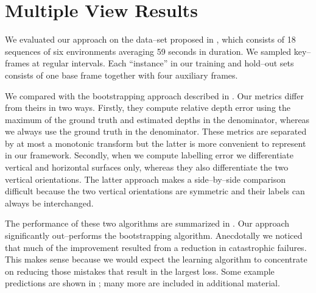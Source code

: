 \section{Multiple View Results}
\label{sec:mv-results}

We evaluated our approach on the data--set proposed in \cite{Flint11},
which consists of 18 sequences of six environments averaging 59
seconds in duration. We sampled key--frames at regular intervals. Each
``instance'' in our training and hold--out sets consists of one base
frame together with four auxiliary frames.

We compared with the bootstrapping approach described in
\cite{Flint11}. Our metrics differ from theirs in two ways. Firstly,
they compute relative depth error using the maximum of the ground
truth and estimated depths in the denominator, whereas we always use
the ground truth in the denominator. These metrics are separated by at
most a monotonic transform but the latter is more convenient to
represent in our framework. Secondly, when we compute labelling error
we differentiate vertical and horizontal surfaces only, whereas they
also differentiate the two vertical orientations. The latter approach
makes a side--by--side comparison difficult because the two vertical
orientations are symmetric and their labels can always be
interchanged.

The performance of these two algorithms are summarized in
. Our approach significantly out--performs the
bootstrapping algorithm. Anecdotally we noticed that much of the
improvement resulted from a reduction in catastrophic failures. This
makes sense because we would expect the learning algorithm to
concentrate on reducing those mistakes that result in the largest
loss. Some example predictions are shown in ;
many more are included in additional material.

